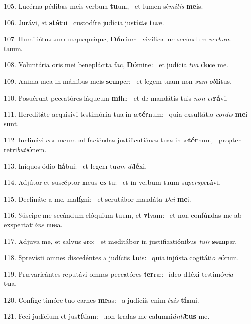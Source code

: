105. Lucérna pédibus meis verbum \textbf{tu}um, \ast\  et lumen sé\textit{mi}\textit{tis} \textbf{me}is.\

106. Jurávi, et \textbf{stá}tui \ast\  custodíre judícia justí\textit{ti}\textit{æ} \textbf{tu}æ.\

107. Humiliátus sum usquequáque, \textbf{Dó}mine: \ast\  vivífica me secúndum \textit{ver}\textit{bum} \textbf{tu}um.\

108. Voluntária oris mei beneplácita fac, \textbf{Dó}mine: \ast\  et judícia \textit{tu}\textit{a} \textbf{do}ce me.\

109. Anima mea in mánibus meis \textbf{sem}per: \ast\  et legem tuam non \textit{sum} \textit{ob}\textbf{lí}tus.\

110. Posuérunt peccatóres láqueum \textbf{mi}hi: \ast\  et de mandátis tuis \textit{non} \textit{er}\textbf{rá}vi.\

111. Hereditáte acquisívi testimónia tua in æ\textbf{tér}num: \ast\  quia exsultátio \textit{cor}\textit{dis} \textbf{me}i sunt.\

112. Inclinávi cor meum ad faciéndas justificatiónes tuas in æ\textbf{tér}num, \ast\  propter retri\textit{bu}\textit{ti}\textbf{ó}nem.\

113. Iníquos ódio \textbf{há}bui: \ast\  et legem tu\textit{am} \textit{di}\textbf{lé}xi.\

114. Adjútor et suscéptor meus \textbf{es} tu: \ast\  et in verbum tuum su\textit{per}\textit{spe}\textbf{rá}vi.\

115. Declináte a me, ma\textbf{lí}gni: \ast\  et scrutábor mandáta \textit{De}\textit{i} \textbf{me}i.\

116. Súscipe me secúndum elóquium tuum, et \textbf{vi}vam: \ast\  et non confúndas me ab exspectati\textit{ó}\textit{ne} \textbf{me}a.\

117. Adjuva me, et salvus \textbf{e}ro: \ast\  et meditábor in justificatiónibus \textit{tu}\textit{is} \textbf{sem}per.\

118. Sprevísti omnes discedéntes a judíciis \textbf{tu}is: \ast\  quia injústa cogitáti\textit{o} \textit{e}\textbf{ó}rum.\

119. Prævaricántes reputávi omnes peccatóres \textbf{ter}ræ: \ast\  ídeo diléxi testimó\textit{ni}\textit{a} \textbf{tu}a.\

120. Confíge timóre tuo carnes \textbf{me}as: \ast\  a judíciis enim \textit{tu}\textit{is} \textbf{tí}mui.\

121. Feci judícium et jus\textbf{tí}tiam: \ast\  non tradas me calumni\textit{án}\textit{ti}\textbf{bus} me.\

